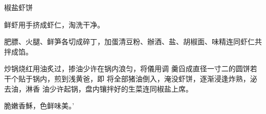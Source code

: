\begin{recipe}{椒盐虾饼}

\ingredients


\cooking

\step 鲜虾用手挤成虾仁，淘洗干净。

\step 肥膘、火腿、鲜笋各切成碎丁，加蛋清豆粉、辦酒、盐、胡椒面、味精连同虾仁共拌成馅。

炒锅烧红用油炙过，掺油少许在锅内浪匀，将儀用调 羹舀成直径一寸二的圆饼若干个贴于锅内，煎到浅黄爸，即 将全部猪油倒入，淹没虾饼，逐渐浸逢炸熟，泌去油，淋香 油少许起锅，盘内镶拌好的生菜连同椒盐上席。

\notes

脆嫩香穌，色鲜味美。’

\end{recipe}

